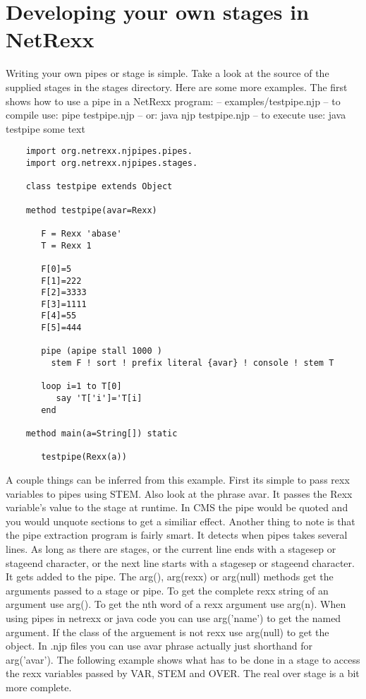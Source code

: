 \chapter{Developing your own stages in NetRexx}
Writing your own pipes or stage is simple.  Take a look at the source of the supplied stages in the stages directory.  Here are some more examples.  The first shows how to use a pipe in a NetRexx program:
    -- examples/testpipe.njp
    -- to compile use: pipe testpipe.njp
    --             or: java njp testpipe.njp
    -- to execute use: java testpipe some text
\begin{lstlisting}
    import org.netrexx.njpipes.pipes.
    import org.netrexx.njpipes.stages.

    class testpipe extends Object

    method testpipe(avar=Rexx)

       F = Rexx 'abase'
       T = Rexx 1

       F[0]=5
       F[1]=222
       F[2]=3333
       F[3]=1111
       F[4]=55
       F[5]=444

       pipe (apipe stall 1000 )
         stem F ! sort ! prefix literal {avar} ! console ! stem T

       loop i=1 to T[0]
          say 'T['i']='T[i]
       end

    method main(a=String[]) static

       testpipe(Rexx(a))
\end{lstlisting}
 A couple things can be inferred from this example.  First its simple to pass rexx variables to pipes using STEM.  Also look at the  phrase {avar}. It passes the Rexx variable's value to the stage at runtime.  In CMS the pipe would be quoted and you would unquote sections to get a similiar effect.
Another thing to note is that the pipe extraction program is fairly smart. It detects when pipes takes several lines.  As long as there are stages, or the current line ends with a stagesep or stageend character, or the next line starts with a stagesep or stageend character.  It gets added to the pipe.
The arg(), arg(rexx) or arg(null) methods get the arguments passed to a stage or pipe.  To get the complete rexx string of an argument use arg(). To get the nth word of a rexx argument use arg(n).  When using pipes in netrexx or java code you can use arg('name') to get the named argument. If the class of the arguement is not rexx use arg(null) to get the object.
In .njp files you can use {avar} phrase actually just shorthand for  arg('avar').
The following example shows what has to be done in a stage to access the rexx variables passed by VAR, STEM and OVER.  The real  over stage is a bit more complete.
